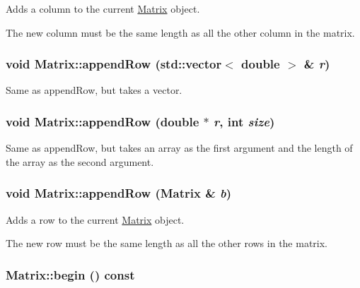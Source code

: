 Adds a column to the current \hyperlink{class_matrix}{Matrix} object. 

The new column must be the same length as all the other column in the matrix. \hypertarget{class_matrix_a934b0686d9a2b971e9740b9a29224a54}{
\subsubsection[{appendRow}]{\setlength{\rightskip}{0pt plus 5cm}void Matrix::appendRow (std::vector$<$ double $>$ \& {\em r})}}
\label{class_matrix_a934b0686d9a2b971e9740b9a29224a54}


Same as appendRow, but takes a vector. 

\hypertarget{class_matrix_a55104cb3fcf93a887ac713955fc0f5c9}{
\subsubsection[{appendRow}]{\setlength{\rightskip}{0pt plus 5cm}void Matrix::appendRow (double $\ast$ {\em r}, \/  int {\em size})}}
\label{class_matrix_a55104cb3fcf93a887ac713955fc0f5c9}


Same as appendRow, but takes an array as the first argument and the length of the array as the second argument. 

\hypertarget{class_matrix_a20c175983a6b23a83fccfe8f726b3b07}{
\subsubsection[{appendRow}]{\setlength{\rightskip}{0pt plus 5cm}void Matrix::appendRow ({\bf Matrix} \& {\em b})}}
\label{class_matrix_a20c175983a6b23a83fccfe8f726b3b07}


Adds a row to the current \hyperlink{class_matrix}{Matrix} object. 

The new row must be the same length as all the other rows in the matrix. \hypertarget{class_matrix_a8969f52f950b124d5a40128c3df11efe}{
\subsubsection[{begin}]{ Matrix::begin () const}}
\label{class_matrix_a8969f52f950b124d5a40128c3df11efe}


